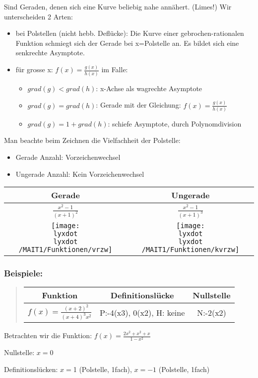 Sind Geraden, denen sich eine Kurve beliebig nahe annähert. (Limes!)
Wir unterscheiden 2 Arten:
\begin{itemize}
\item bei Polstellen (nicht hebb. Deflücke): Die Kurve einer gebrochen-rationalen
Funktion schmiegt sich der Gerade bei x=Polstelle an. Es bildet sich
eine senkrechte Asymptote.
\item für grosse x: $f(x)=\frac{g(x)}{h(x)}$ im Falle:

\begin{itemize}
\item $grad(g)<grad(h)$: x-Achse als wagrechte Asymptote
\item $grad(g)=grad(h)$: Gerade mit der Gleichung: $f(x)=\frac{g(x)}{h(x)}$
\item $grad(g)=1+grad(h)$: schiefe Asymptote, durch Polynomdivision
\end{itemize}
\end{itemize}
Man beachte beim Zeichnen die Vielfachheit der Polstelle:
\begin{itemize}
\item Gerade Anzahl: Vorzeichenwechsel
\item Ungerade Anzahl: Kein Vorzeichenwechsel
\end{itemize}
\begin{tabular}{|c|c|}
\hline 
Gerade & Ungerade\tabularnewline
\hline 
$\frac{x^{2}-1}{(x+1)^{2}}$ & $\frac{x^{2}-1}{(x+1)^{3}}$\tabularnewline
\hline 
\texttt{[image: \\lyxdot \\lyxdot /MAIT1/Funktionen/vrzw]} & \texttt{[image: \\lyxdot \\lyxdot /MAIT1/Funktionen/kvrzw]}\tabularnewline
\hline 
\end{tabular}


\subsubsection*{Beispiele:}
\begin{verse}
\begin{tabular}{|c|c|c|}
\hline 
Funktion & Definitionslücke & Nullstelle\tabularnewline
\hline 
\hline 
$f(x)=\frac{(x+2)^{2}}{(x+4)^{3}x^{2}}$ & P:-4(x3), 0(x2), H: keine & N:-2(x2)\tabularnewline
\hline 
\end{tabular}
\end{verse}


Betrachten wir die Funktion: $f(x)=\frac{2x^{2}+x^{2}+x}{1-x^{2}}$

Nullstelle: $x=0$

Definitionslücken: $x=$1 (Polstelle, 1fach), $x=-1$ (Polstelle,
1fach)

